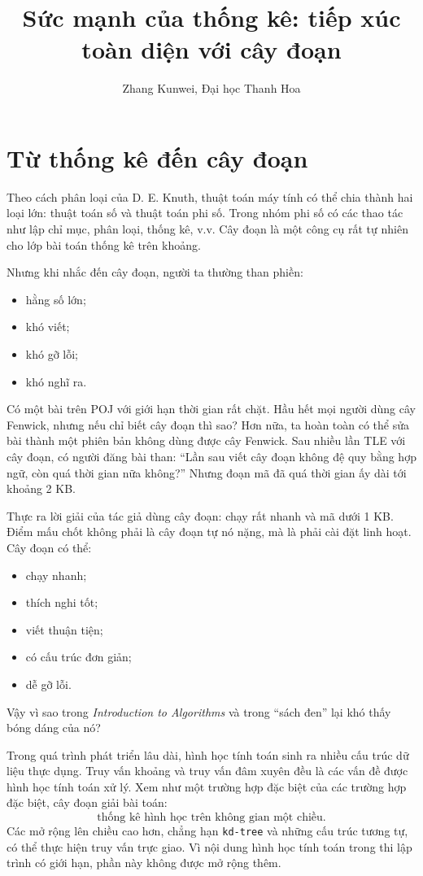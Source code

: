 \documentclass[11pt]{article}
\title{Sức mạnh của thống kê: tiếp xúc toàn diện với cây đoạn}
\author{Zhang Kunwei, Đại học Thanh Hoa}
\date{}
\begin{document}
\maketitle

\section{Từ thống kê đến cây đoạn}

Theo cách phân loại của D. E. Knuth, thuật toán máy tính có thể chia thành hai
loại lớn: thuật toán số và thuật toán phi số.  Trong nhóm phi số có các thao
tác như lập chỉ mục, phân loại, thống kê, v.v.  Cây đoạn là một công cụ rất
tự nhiên cho lớp bài toán thống kê trên khoảng.

Nhưng khi nhắc đến cây đoạn, người ta thường than phiền:
\begin{itemize}
  \item hằng số lớn;
  \item khó viết;
  \item khó gỡ lỗi;
  \item khó nghĩ ra.
\end{itemize}

Có một bài trên POJ với giới hạn thời gian rất chặt.  Hầu hết mọi người dùng
cây Fenwick, nhưng nếu chỉ biết cây đoạn thì sao?  Hơn nữa, ta hoàn toàn có
thể sửa bài thành một phiên bản không dùng được cây Fenwick.  Sau nhiều lần
TLE với cây đoạn, có người đăng bài than: ``Lần sau viết cây đoạn không đệ quy
bằng hợp ngữ, còn quá thời gian nữa không?''  Nhưng đoạn mã đã quá thời gian
ấy dài tới khoảng 2 KB.

Thực ra lời giải của tác giả dùng cây đoạn: chạy rất nhanh và mã dưới 1 KB.
Điểm mấu chốt không phải là cây đoạn tự nó nặng, mà là phải cài đặt linh hoạt.
Cây đoạn có thể:
\begin{itemize}
  \item chạy nhanh;
  \item thích nghi tốt;
  \item viết thuận tiện;
  \item có cấu trúc đơn giản;
  \item dễ gỡ lỗi.
\end{itemize}

Vậy vì sao trong \emph{Introduction to Algorithms} và trong ``sách đen'' lại
khó thấy bóng dáng của nó?

Trong quá trình phát triển lâu dài, hình học tính toán sinh ra nhiều cấu trúc
dữ liệu thực dụng.  Truy vấn khoảng và truy vấn đâm xuyên đều là các vấn đề
được hình học tính toán xử lý.  Xem như một trường hợp đặc biệt của các trường
hợp đặc biệt, cây đoạn giải bài toán:
\[
  \text{thống kê hình học trên không gian một chiều.}
\]
Các mở rộng lên chiều cao hơn, chẳng hạn \texttt{kd-tree} và những cấu trúc
tương tự, có thể thực hiện truy vấn trực giao.  Vì nội dung hình học tính toán
trong thi lập trình có giới hạn, phần này không được mở rộng thêm.
\end{document}
